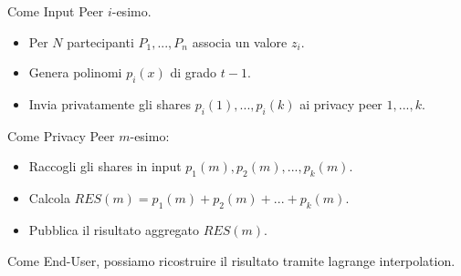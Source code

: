 \begin{theorem}
Come Input Peer $i$-esimo.\footnotemark
\begin{itemize}
    \item Per $N$ partecipanti $P_1,...,P_n$ associa un valore $z_i$.
    \item Genera polinomi $p_i(x)$ di grado $t-1$.
    \item Invia privatamente gli shares $p_i(1),...,p_i(k)$ ai privacy peer $1,...,k$.
\end{itemize}
Come Privacy Peer $m$-esimo:
\begin{itemize}
    \item Raccogli gli shares in input $p_1(m),p_2(m),...,p_k(m)$.
    \item Calcola $RES(m)=p_1(m)+p_2(m)+...+p_k(m)$.
    \item Pubblica il risultato aggregato $RES(m)$.
\end{itemize}
Come End-User, possiamo ricostruire il risultato tramite lagrange interpolation.
\end{theorem}
